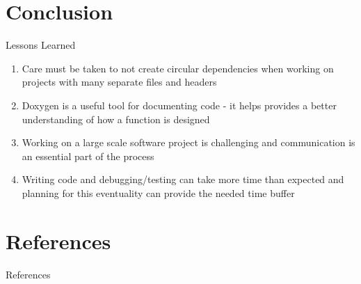\documentclass[10pt,aspectratio=169]{beamer}
\begin{document}
\section{Conclusion}%
    \begin{frame}{Lessons Learned}
        \begin{enumerate}
            \item Care must be taken to not create circular dependencies when working on projects with many separate files and headers
            \item Doxygen is a useful tool for documenting code - it helps provides a better understanding of how a function is designed
            \item Working on a large scale software project is challenging and communication is an essential part of the process
            \item Writing code and debugging/testing can take more time than expected and planning for this eventuality can provide the needed time buffer
        \end{enumerate}
    \end{frame}

\section{References}%

    \begin{frame}[t]{References}
            \footnotesize
            
    \end{frame}
\end{document}
